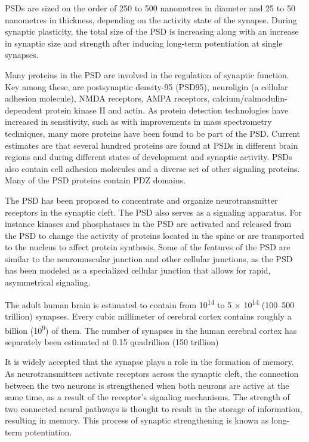 PSDs are sized on the order of 250 to 500 nanometres in diameter and 25 to 50 nanometres in thickness, depending on the activity state of the synapse. During synaptic plasticity, the total size of the PSD is increasing along with an increase in synaptic size and strength after inducing long-term potentiation at single synapses.

Many proteins in the PSD are involved in the regulation of synaptic function. Key among these, are postsynaptic density-95 (PSD95), neuroligin (a cellular adhesion molecule), NMDA receptors, AMPA receptors, calcium/calmodulin-dependent protein kinase II and actin. As protein detection technologies have increased in sensitivity, such as with improvements in mass spectrometry techniques, many more proteins have been found to be part of the PSD. Current estimates are that several hundred proteins are found at PSDs in different brain regions and during different states of development and synaptic activity. PSDs also contain cell adhesion molecules and a diverse set of other signaling proteins. Many of the PSD proteins contain PDZ domains.

The PSD has been proposed to concentrate and organize neurotransmitter receptors in the synaptic cleft. The PSD also serves as a signaling apparatus. For instance kinases and phosphatases in the PSD are activated and released from the PSD to change the activity of proteins located in the spine or are transported to the nucleus to affect protein synthesis. Some of the features of the PSD are similar to the neuromuscular junction and other cellular junctions, as the PSD has been modeled as a specialized cellular junction that allows for rapid, asymmetrical signaling.

The adult human brain is estimated to contain from 10\textsuperscript{14} to 5 × 10\textsuperscript{14} (100--500 trillion) synapses. Every cubic millimeter of cerebral cortex contains roughly a billion (10\textsuperscript{9}) of them. The number of synapses in the human cerebral cortex has separately been estimated at 0.15 quadrillion (150 trillion)

It is widely accepted that the synapse plays a role in the formation of memory. As neurotransmitters activate receptors across the synaptic cleft, the connection between the two neurons is strengthened when both neurons are active at the same time, as a result of the receptor's signaling mechanisms. The strength of two connected neural pathways is thought to result in the storage of information, resulting in memory. This process of synaptic strengthening is known as long-term potentiation.

